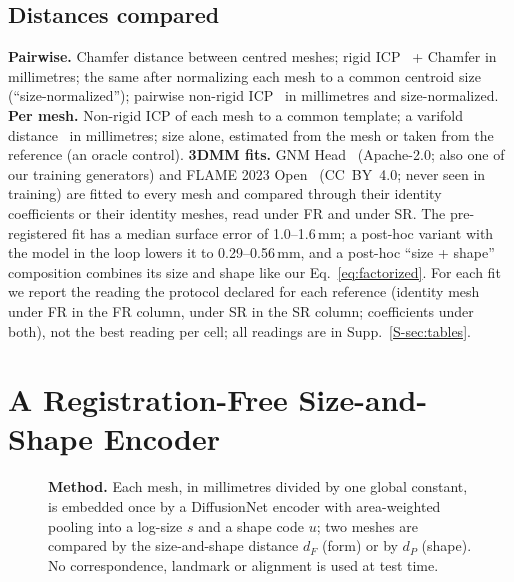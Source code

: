 \documentclass[10pt,twocolumn,letterpaper]{article}
\begin{document}
\subsection{Distances compared}
\label{sec:competitors}
\textbf{Pairwise.} Chamfer distance between centred meshes; rigid ICP~\cite{besl1992icp} + Chamfer in millimetres; the same after normalizing each mesh to a common centroid size (``size-normalized''); pairwise non-rigid ICP~\cite{amberg2007nicp} in millimetres and size-normalized. \textbf{Per mesh.} Non-rigid ICP of each mesh to a common template; a varifold distance~\cite{kaltenmark2017general} in millimetres; size alone, estimated from the mesh or taken from the reference (an oracle control). \textbf{3DMM fits.} GNM Head~\cite{ploumpis2026gnmhead} (Apache-2.0; also one of our training generators) and FLAME 2023 Open~\cite{li2017flame} (CC~BY~4.0; never seen in training) are fitted to every mesh and compared through their identity coefficients or their identity meshes, read under FR and under SR. The pre-registered fit has a median surface error of 1.0--1.6\,mm; a post-hoc variant with the model in the loop lowers it to 0.29--0.56\,mm, and a post-hoc ``size + shape'' composition combines its size and shape like our Eq.~\eqref{eq:factorized}.
For each fit we report the reading the protocol declared for each reference (identity mesh under FR in the FR column, under SR in the SR column; coefficients under both), not the best reading per cell; all readings are in Supp.~\ref{S-sec:tables}.

\section{A Registration-Free Size-and-Shape Encoder}
\label{sec:method}

\begin{figure}[t]
  \centering
  \resizebox{0.92\textwidth}{!}{}
  \caption{\textbf{Method.} Each mesh, in millimetres divided by one global constant, is embedded once by a DiffusionNet encoder with area-weighted pooling into a log-size $s$ and a shape code $u$; two meshes are compared by the size-and-shape distance $d_F$ (form) or by $d_P$ (shape). No correspondence, landmark or alignment is used at test time.}
  \label{fig:method}
\end{figure}
\end{document}
